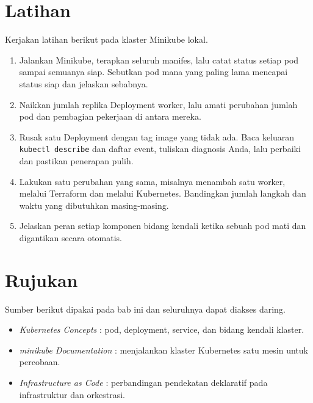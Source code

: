 \section{Latihan}

Kerjakan latihan berikut pada klaster Minikube lokal.

\begin{enumerate}
  \item Jalankan Minikube, terapkan seluruh manifes, lalu catat status setiap pod sampai semuanya siap. Sebutkan pod mana yang paling lama mencapai status siap dan jelaskan sebabnya.
  \item Naikkan jumlah replika Deployment worker, lalu amati perubahan jumlah pod dan pembagian pekerjaan di antara mereka.
  \item Rusak satu Deployment dengan tag image yang tidak ada. Baca keluaran \texttt{kubectl describe} dan daftar event, tuliskan diagnosis Anda, lalu perbaiki dan pastikan penerapan pulih.
  \item Lakukan satu perubahan yang sama, misalnya menambah satu worker, melalui Terraform dan melalui Kubernetes. Bandingkan jumlah langkah dan waktu yang dibutuhkan masing-masing.
  \item Jelaskan peran setiap komponen bidang kendali ketika sebuah pod mati dan digantikan secara otomatis.
\end{enumerate}

\section{Rujukan}

Sumber berikut dipakai pada bab ini dan seluruhnya dapat diakses daring.

\begin{itemize}
  \item \textit{Kubernetes Concepts} \cite{doc-k8s}: pod, deployment, service, dan bidang kendali klaster.
  \item \textit{minikube Documentation} \cite{doc-minikube}: menjalankan klaster Kubernetes satu mesin untuk percobaan.
  \item \textit{Infrastructure as Code} \cite{morris2021iac}: perbandingan pendekatan deklaratif pada infrastruktur dan orkestrasi.
\end{itemize}
